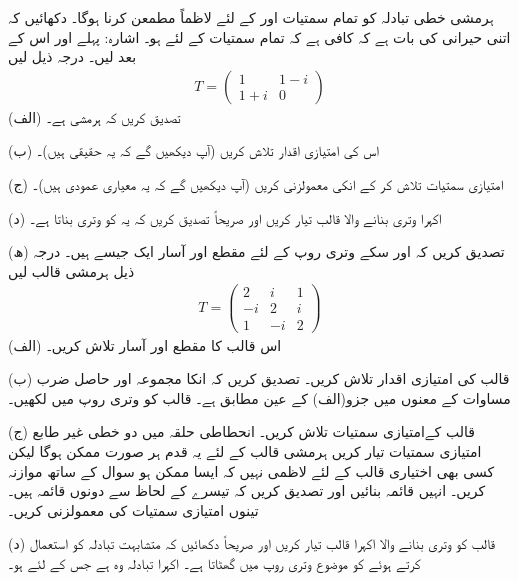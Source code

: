 ہرمشی خطی تبادلہ کو تمام سمتیات  اور  کے لئے لاظماً  مطمعن کرنا ہوگا۔ دکھائیں کہ اتنی حیرانی کی بات ہے کہ کافی ہے کہ تمام سمتیات  کے لئے  ہو۔ اشارہ: پہلے  اور اس کے بعد  لیں۔ 
درجہ ذیل لیں
\begin{align*}
	T=
	\begin{pmatrix}
		1 & 1-i\\
		1+i & 0
	\end{pmatrix}
\end{align*}
(الف) تصدیق کریں کہ  ہرمشی ہے۔

(ب) اس کی امتیازی اقدار تلاش کریں (آپ دیکھیں گے کہ یہ حقیقی ہیں)۔

(ج) امتیازی سمتیات تلاش کر کے انکی معمولزنی کریں (آپ دیکھیں گے کہ یہ معیاری عمودی ہیں)۔

(د) اکہرا وتری بنانے والا قالب  تیار کریں اور صریحاً تصدیق کریں کہ یہ  کو وتری بناتا ہے۔

(ھ) تصدیق کریں کہ  اور سکے وتری روپ کے لئے مقطع  اور آسار  ایک جیسے ہیں۔
درجہ ذیل ہرمشی قالب لیں
\begin{align*}
	T=
	\begin{pmatrix}
		2 & i & 1\\
		-i & 2 & i\\
		1 & -i & 2
	\end{pmatrix}
\end{align*}
(الف) اس قالب کا مقطع  اور آسار  تلاش کریں۔

(ب) قالب  کی امتیازی اقدار تلاش کریں۔ تصدیق کریں کہ انکا مجموعہ اور حاصل ضرب مساوات  کے معنوں میں جزو(الف) کے عین مطابق ہے۔ قالب  کو وتری روپ میں لکھیں۔

(ج) قالب  کےامتیازی سمتیات تلاش کریں۔ انحطاطی حلقہ میں دو خطی غیر طابع امتیازی سمتیات تیار کریں ہرمشی قالب کے لئے یہ قدم ہر صورت ممکن ہوگا لیکن کسی بھی اختیاری قالب کے لئے لاظمی نہیں کہ ایسا ممکن ہو سوال  کے ساتھ موازنہ کریں۔ انہیں قائمہ بنائیں اور تصدیق کریں کہ تیسرے کے لحاظ سے دونوں قائمہ ہیں۔ تینوں امتیازی سمتیات کی معمولزنی کریں۔

(د) قالب  کو وتری بنانے والا اکہرا قالب  تیار کریں اور صریحاً دکھائیں کہ متشابہت تبادلہ  کو استعمال کرتے ہوئے  کو موضوع وتری روپ میں گھٹاتا ہے۔
اکہرا تبادلہ وہ ہے جس کے لئے  ہو۔

